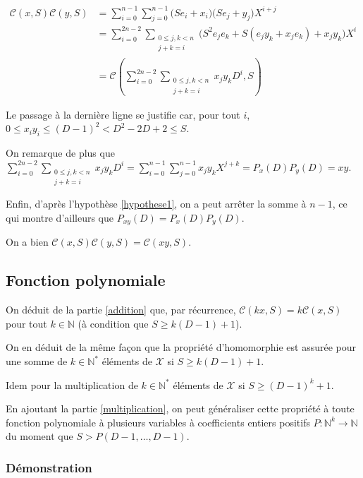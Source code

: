 \documentclass{article}
\begin{document}
\begin{align}
\mathcal{C}(x, S)\mathcal{C}(y, S) &= \displaystyle \sum_{i=0}^{n-1} \sum_{j=0}^{n-1} \Big( Se_i + x_i \Big) \Big( Se_j + y_j \Big) X^{i+j}\\
&=\displaystyle \sum_{i=0}^{2n-2} \sum_{\substack{0\le j,k < n\\ j+k=i}}\Big( S^2 e_j e_k + S(e_j y_k + x_j e_k) + x_j y_k \Big) X^{i}\\
&= \mathcal{C}(\displaystyle \sum_{i=0}^{2n-2} \sum_{\substack{0\le j,k < n\\ j+k=i}} x_jy_k D^i, S)
\end{align}

Le passage à la dernière ligne se justifie car, pour tout $i$, $0\le x_i y_i \le (D-1)^2 < D^2-2D+2 \le S$.

On remarque de plus que $\displaystyle \sum_{i=0}^{2n-2} \sum_{\substack{0\le j,k < n\\ j+k=i}} x_jy_k D^i = \sum_{i=0}^{n-1}\sum_{j=0}^{n-1} x_jy_k X^{j+k} = P_x(D)P_y(D)=xy$.

Enfin, d'après l'hypothèse \ref{hypothese1}, on a peut arrêter la somme à $n-1$, ce qui montre d'ailleurs que $P_{xy}(D)=P_x(D)P_y(D)$.

On a bien $\mathcal{C}(x, S)\mathcal{C}(y, S) = \mathcal{C}(xy, S)$.


\subsection{Fonction polynomiale}

On déduit de la partie \ref{addition} que, par récurrence, $\mathcal{C}(kx, S)= k\mathcal{C}(x, S)$ pour tout $k\in\mathbb{N}$ (à condition que $S\ge k(D-1)+1$).

On en déduit de la même façon que la propriété d'homomorphie est assurée pour une somme de $k\in\mathbb{N}^*$ éléments de $\mathcal{X}$ si $S\ge k(D-1)+1$.

Idem pour la multiplication de $k\in\mathbb{N}^*$ éléments de $\mathcal{X}$ si $S\ge (D-1)^k+1$.

En ajoutant la partie \ref{multiplication}, on peut généraliser cette propriété à toute fonction polynomiale à plusieurs variables à coefficients entiers positifs $P:\mathbb{N}^k\longrightarrow\mathbb{N}$ du moment que $S>P(D-1,\dots, D-1)$.

\subsubsection{Démonstration}
\end{document}
